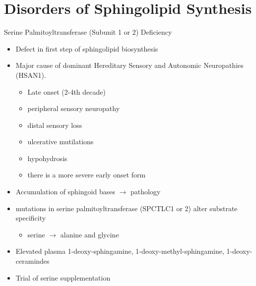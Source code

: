 \documentclass[presentation, smaller]{beamer}
\begin{document}
\section{Disorders of Sphingolipid Synthesis}
\label{sec:orgheadline16}

\begin{frame}[label={sec:orgheadline7}]{Serine Palmitoyltransferase (Subunit 1 or 2) Deficiency}
\begin{itemize}
\item Defect in first step of sphingolipid biosynthesis
\item Major cause of dominant Hereditary Sensory and Autonomic Neuropathies (HSAN1).
\begin{itemize}
\item Late onset (2-4th decade)
\item peripheral sensory neuropathy
\item distal sensory loss
\item ulcerative mutilations
\item hypohydrosis
\item there is a more severe early onset form
\end{itemize}
\item Accumulation of sphingoid bases \(\to\) pathology
\item mutations in serine palmitoyltransferase (SPCTLC1 or 2) alter
substrate specificity
\begin{itemize}
\item serine \(\to\) alanine and glycine
\end{itemize}
\item Elevated plasma 1-deoxy-sphingamine, 1-deoxy-methyl-sphingamine, 1-deoxy-ceramindes
\item Trial of serine supplementation
\end{itemize}
\end{frame}
\end{document}

